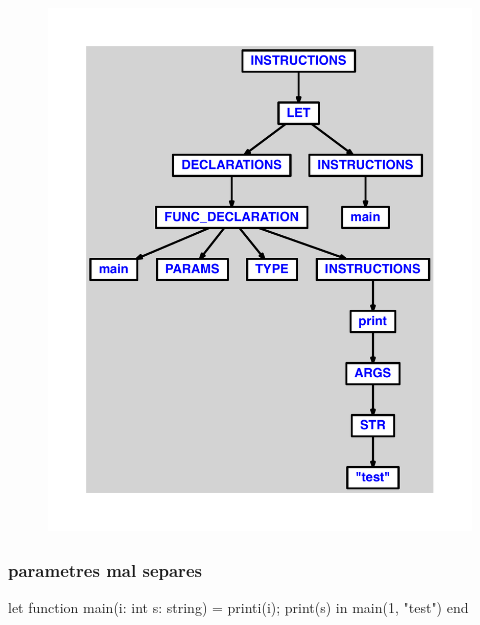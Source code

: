 \documentclass{article}
\begin{document}
\begin{figure}[H]\centering\includegraphics[max width=\textwidth]{ast/ast_214.pdf}\end{figure}\subsubsection{parametres mal separes}
\begin{verbatimtab}
let
	function main(i: int s: string) =
		printi(i);
		print(s)
in main(1, "test") end
\end{verbatimtab}
\end{document}

